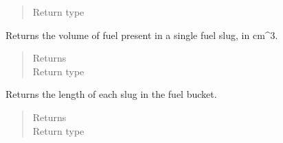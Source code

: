 \documentclass[letterpaper,10pt,openany,oneside,english]{sphinxmanual}
\begin{document}
\begin{fulllineitems}
\begin{fulllineitems}
\begin{quote}
\begin{description}
\item[{Return type}] \leavevmode
{}

\end{description}\end{quote}

\end{fulllineitems}


\begin{fulllineitems}
\label{\detokenize{support_rst/fuel_bucket:fuel_bucket.FuelBucket.slug_fuel_volume}}
Returns the volume of fuel present in a single fuel slug, in cm\textasciicircum{}3.
\begin{quote}\begin{description}
\item[{Returns}] \leavevmode
{}

\item[{Return type}] \leavevmode
{}

\end{description}\end{quote}

\end{fulllineitems}


\begin{fulllineitems}
\label{\detokenize{support_rst/fuel_bucket:fuel_bucket.FuelBucket.slug_length}}
Returns the length of each slug in the fuel bucket.
\begin{quote}\begin{description}
\item[{Returns}] \leavevmode
{}

\item[{Return type}] \leavevmode
{}

\end{description}\end{quote}

\end{fulllineitems}


\end{fulllineitems}
\end{document}
